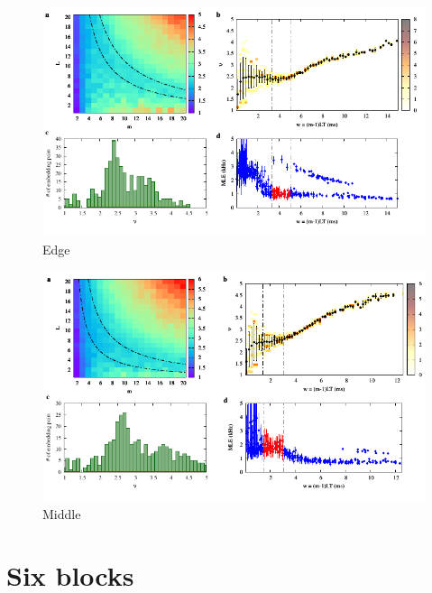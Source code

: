 \begin{figure}[H]
    \centering
    \includegraphics[width=\linewidth]{../5_blocks/edge/2e5_points/plots/chaos_low.pdf}
    \caption{Edge}
    \label{fig:5 blocks chaos}
\end{figure}

\begin{figure}[H]
    \centering
    \includegraphics[width=\linewidth]{../5_blocks/middle/2e5_points/plots/chaos_low.pdf}
    \caption{Middle}
    \label{fig:5 blocks chaos middle}
\end{figure}

\section{Six blocks}

